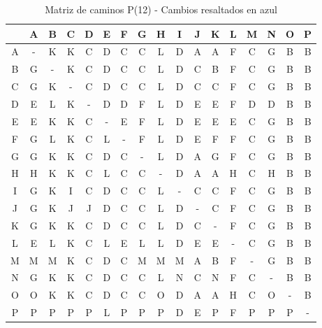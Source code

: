 \documentclass[12pt]{article}
\begin{document}
\begin{table}[h!]
\centering
\begin{tabular}{|c|c|c|c|c|c|c|c|c|c|c|c|c|c|c|c|c|}
\hline
 & A & B & C & D & E & F & G & H & I & J & K & L & M & N & O & P \\\hline
A & - & K & K & C & D & C & C & \cellcolor{lightblue} L & D & A & A & F & C & G & B & B \\\hline
B & G & - & K & C & D & C & C & \cellcolor{lightblue} L & D & C & B & F & C & G & B & B \\\hline
C & G & K & - & C & D & C & C & \cellcolor{lightblue} L & D & C & C & F & C & G & B & B \\\hline
D & E & \cellcolor{lightblue} L & K & - & D & D & F & \cellcolor{lightblue} L & D & E & E & F & D & D & B & B \\\hline
E & E & K & K & C & - & E & F & \cellcolor{lightblue} L & D & E & E & E & C & G & B & B \\\hline
F & G & \cellcolor{lightblue} L & K & C & \cellcolor{lightblue} L & - & F & \cellcolor{lightblue} L & D & \cellcolor{lightblue} E & F & F & C & G & B & B \\\hline
G & G & K & K & C & D & C & - & \cellcolor{lightblue} L & D & A & G & F & C & G & B & B \\\hline
H & H & K & K & C & \cellcolor{lightblue} L & C & C & - & D & A & A & H & C & H & B & B \\\hline
I & G & K & I & C & D & C & C & \cellcolor{lightblue} L & - & C & C & F & C & G & B & B \\\hline
J & G & K & J & J & D & C & C & \cellcolor{lightblue} L & D & - & C & F & C & G & B & B \\\hline
K & G & K & K & C & D & C & C & \cellcolor{lightblue} L & D & C & - & F & C & G & B & B \\\hline
L & E & L & K & C & L & E & L & L & D & E & E & - & C & G & B & B \\\hline
M & M & M & K & C & D & C & M & M & M & A & B & F & - & G & B & B \\\hline
N & G & K & K & C & D & C & C & \cellcolor{lightblue} L & N & C & N & F & C & - & B & B \\\hline
O & O & K & K & C & D & C & C & O & D & A & A & H & C & O & - & B \\\hline
P & P & P & P & P & \cellcolor{lightblue} L & P & P & P & D & E & P & F & P & P & P & - \\\hline
\end{tabular}
\caption{Matriz de caminos P(12) - Cambios resaltados en azul}
\end{table}
\end{document}
